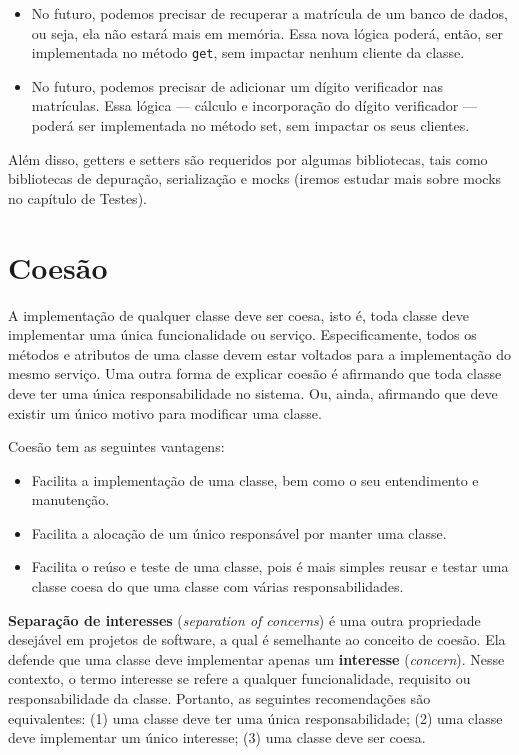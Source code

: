 \documentclass[
  11pt,
  twoside]{book}
\newcommand{\passthrough}[1]{#1}
\begin{document}
\begin{itemize}
\item
  No futuro, podemos precisar de recuperar a matrícula de um banco de
  dados, ou seja, ela não estará mais em memória. Essa nova lógica
  poderá, então, ser implementada no método
  \passthrough{\lstinline!get!}, sem impactar nenhum cliente da classe.
\item
  No futuro, podemos precisar de adicionar um dígito verificador nas
  matrículas. Essa lógica --- cálculo e incorporação do dígito
  verificador --- poderá ser implementada no método set, sem impactar os
  seus clientes.
\end{itemize}

Além disso, getters e setters são requeridos por algumas bibliotecas,
tais como bibliotecas de depuração, serialização e mocks (iremos estudar
mais sobre mocks no capítulo de Testes).

\hypertarget{coesuxe3o}{%
\section{Coesão}\label{coesuxe3o}}


A implementação de qualquer classe deve ser coesa, isto é, toda classe
deve implementar uma única funcionalidade ou serviço. Especificamente,
todos os métodos e atributos de uma classe devem estar voltados para a
implementação do mesmo serviço. Uma outra forma de explicar coesão é
afirmando que toda classe deve ter uma única responsabilidade no
sistema. Ou, ainda, afirmando que deve existir um único motivo para
modificar uma classe.

Coesão tem as seguintes vantagens:

\begin{itemize}
\item
  Facilita a implementação de uma classe, bem como o seu entendimento e
  manutenção.
\item
  Facilita a alocação de um único responsável por manter uma classe.
\item
  Facilita o reúso e teste de uma classe, pois é mais simples reusar e
  testar uma classe coesa do que uma classe com várias
  responsabilidades.
\end{itemize}

 \textbf{Separação de interesses}
(\emph{separation of concerns}) é uma outra propriedade desejável em
projetos de software, a qual é semelhante ao conceito de coesão. Ela
defende que uma classe deve implementar apenas um \textbf{interesse}
(\emph{concern}). Nesse contexto, o termo interesse se refere a qualquer
funcionalidade, requisito ou responsabilidade da classe. Portanto, as
seguintes recomendações são equivalentes: (1) uma classe deve ter uma
única responsabilidade; (2) uma classe deve implementar um único
interesse; (3) uma classe deve ser coesa.
\end{document}
